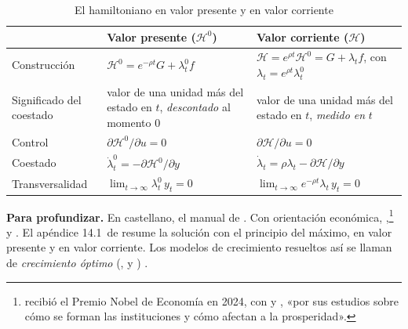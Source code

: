 \documentclass[11pt]{article}
\begin{document}
\begin{table}[H]
\centering
\caption{El hamiltoniano en valor presente y en valor corriente}\label{tab:hamiltonianos}
\small
\begin{tabular}{>{\raggedright\arraybackslash}m{2.4cm}>{\raggedright\arraybackslash}m{6cm}>{\raggedright\arraybackslash}m{6cm}}
\toprule
\rowcolor{tceeazulpalido} & \textbf{Valor presente ($\mathcal{H}^0$)} & \textbf{Valor corriente ($\mathcal{H}$)}\\
\midrule
Construcción & $\mathcal{H}^0=e^{-\rho t}G+\lambda^0_t f$ & $\mathcal{H}=e^{\rho t}\mathcal{H}^0=G+\lambda_t f$, con $\lambda_t=e^{\rho t}\lambda^0_t$\\
\addlinespace[0.3em]
Significado del coestado & valor de una unidad más del estado en $t$, \emph{descontado} al momento 0 & valor de una unidad más del estado en $t$, \emph{medido en} $t$\\
\addlinespace[0.3em]
Control & $\partial\mathcal{H}^0/\partial u=0$ & $\partial\mathcal{H}/\partial u=0$\\
\addlinespace[0.3em]
Coestado & $\dot\lambda^0_t=-\partial\mathcal{H}^0/\partial y$ & $\dot\lambda_t=\rho\lambda_t-\partial\mathcal{H}/\partial y$\\
\addlinespace[0.3em]
Transversalidad & $\lim_{t\to\infty}\lambda^0_t\,y_t=0$ & $\lim_{t\to\infty}e^{-\rho t}\lambda_t\,y_t=0$\\
\bottomrule
\end{tabular}
\end{table}

\begin{anotaciones}
\textbf{Para profundizar.} En castellano, el manual de \textcite{Cerda2001Optimizacion}. Con orientación económica, \textcite{Acemoglu2009Introduction},\footnote{ recibió el Premio Nobel de Economía en 2024, con  y , «por sus estudios sobre cómo se forman las instituciones y cómo afectan a la prosperidad»\nocite{NobelPrize2024}.} \textcite{Heijdra2009Foundations} y \textcite{ObstfeldRogoff1996Foundations}. El apéndice 14.1~de \textcite{PermanEtAl2011Natural} resume la solución con el principio del máximo, en valor presente y en valor corriente. Los modelos de crecimiento resueltos así se llaman de \emph{crecimiento óptimo} (,  y ) .
\end{anotaciones}

\end{document}

